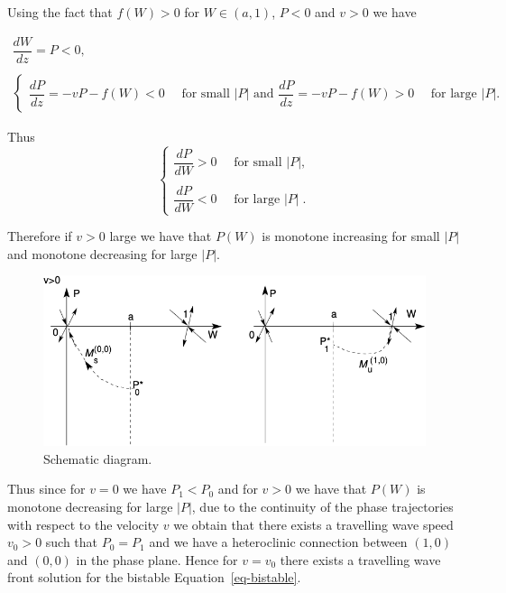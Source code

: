 \documentclass[
  letterpaper,
  DIV=11,
  numbers=noendperiod]{scrreprt}
\theoremstyle{definition}
\theoremstyle{plain}
\theoremstyle{plain}
\theoremstyle{remark}
\begin{document}
Using the fact that \(f(W) >0\) for \(W \in (a,1)\), \(P<0\) and \(v>0\)
we have

\[
\begin{aligned}
\dfrac{dW}{dz} = P <0, \\
\\
\begin{cases}
\dfrac{dP}{dz} = -vP- f(W) <0  \quad \text{ for small }  |P| \textrm{ and } 
 \dfrac{dP}{dz} = -vP- f(W) >0  \quad \text{ for large  } |P|.
\end{cases} 
\end{aligned}
\]

Thus \[
\begin{cases}
\dfrac{dP}{dW}   >0 \quad    \text{ for small }  |P| ,\\
\\
\dfrac{dP}{dW}  <0  \quad  \text{ for large }  |P|\; .
\end{cases}
\]

Therefore if \(v>0\) large we have that \(P(W)\) is monotone increasing
for small \(|P|\) and monotone decreasing for large \(|P|\).

\begin{figure}

{\centering \includegraphics{fig2.png}

}

\caption{\label{fig-2eigenvectors}Schematic diagram.}

\end{figure}

Thus since for \(v=0\) we have \(P_1 < P_0\) and for \(v>0\) we have
that \(P(W)\) is monotone decreasing for large \(|P|\), due to the
continuity of the phase trajectories with respect to the velocity \(v\)
we obtain that there exists a travelling wave speed \(v_0 >0\) such that
\(P_0= P_1\) and we have a heteroclinic connection between \((1,0)\) and
\((0,0)\) in the phase plane. Hence for \(v=v_0\) there exists a
travelling wave front solution for the bistable
Equation~\ref{eq-bistable}.
\end{document}
